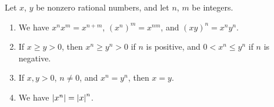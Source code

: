 \begin{proposition}\label{4.3.12}
Let \(x\), \(y\) be nonzero rational numbers, and let \(n\), \(m\) be integers.
\begin{enumerate}
    \item We have \(x^n x^m = x^{n + m}\), \((x^n)^m = x^{nm}\), and \((xy)^n = x^n y^n\).
    \item If \(x \geq y > 0\), then \(x^n \geq y^n > 0\) if \(n\) is positive, and \(0 < x^n \leq y^n\) if \(n\) is negative.
    \item If \(x, y > 0\), \(n \neq 0\), and \(x^n = y^n\), then \(x = y\).
    \item We have \(\abs*{x^n} = \abs*{x}^n\).
\end{enumerate}
\end{proposition}

